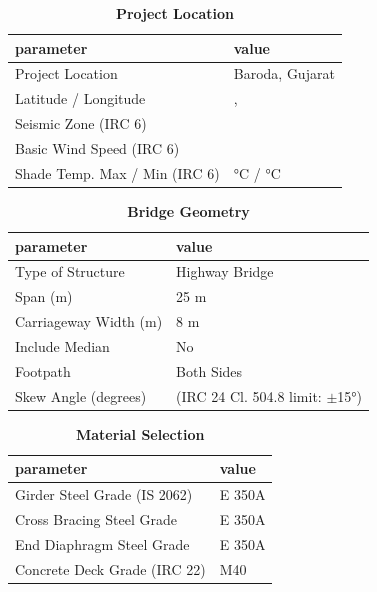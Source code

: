 \documentclass[12pt,a4paper]{report}
\numberwithin{table}{chapter}
\numberwithin{figure}{chapter}
\begin{document}
\begin{table}[H]
\caption{\textbf{Project Location}}
\label{subsec:project-location}
\begin{tabular}{|L{5.5cm}|L{8.5cm}|}
\hline
\textbf{parameter} & \textbf{value} \\
\hline
\textnormal{Project Location} & Baroda, Gujarat \\
\hline
\textnormal{Latitude / Longitude} & ,  \\
\hline
\textnormal{Seismic Zone (IRC 6)} &  \\
\hline
\textnormal{Basic Wind Speed (IRC 6)} &  \\
\hline
\textnormal{Shade Temp. Max / Min (IRC 6)} &  °C /  °C \\
\hline
\end{tabular}
\vspace{0.4cm}
\end{table}

\begin{table}[H]
\caption{\textbf{Bridge Geometry}}
\label{subsec:bridge-geometry}
\begin{tabular}{|L{5.5cm}|L{8.5cm}|}
\hline
\textbf{parameter} & \textbf{value} \\
\hline
\textnormal{Type of Structure} & Highway Bridge \\
\hline
\textnormal{Span (m)} & 25 m \\
\hline
\textnormal{Carriageway Width (m)} & 8 m \\
\hline
\textnormal{Include Median} & No \\
\hline
\textnormal{Footpath} & Both Sides \\
\hline
\textnormal{Skew Angle (degrees)} &  (IRC 24 Cl. 504.8 limit: $\pm$15°) \\
\hline
\end{tabular}
\end{table}
\vspace{0.4cm}

\begin{table}[H]
\caption{\textbf{Material Selection}}
\label{subsec:material}
\begin{tabular}{|L{5.5cm}|L{8.5cm}|}
\hline
\textbf{parameter} & \textbf{value} \\
\hline
\textnormal{Girder Steel Grade (IS 2062)} & E 350A \\
\hline
\textnormal{Cross Bracing Steel Grade} & E 350A \\
\hline
\textnormal{End Diaphragm Steel Grade} & E 350A \\
\hline
\textnormal{Concrete Deck Grade (IRC 22)} & M40 \\
\hline
\end{tabular}
\end{table}
\vspace{0.4cm}
\end{document}
